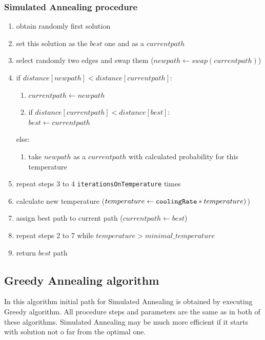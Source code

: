\documentclass[titlepage]{article}
\begin{document}
\subsubsection{Simulated Annealing procedure}

\begin{enumerate}
	\item obtain randomly first solution
	\item set this solution as the $best$ one and as a $currentpath$
	\item select randomly two edges and swap them ($newpath \leftarrow swap(currentpath)$)
	\item if $distance[newpath] < distance[currentpath]$:
	\begin{enumerate}[label*=\arabic*.]
		\item $currentpath \leftarrow newpath$
		\item if $distance[currentpath] < distance[best]$: \\
		\hspace*{5mm} $best \leftarrow currentpath$
	\end{enumerate}
	else:
	\begin{enumerate}[label*=\arabic*.]
		\item take $newpath$ as a $currentpath$ with calculated probability for this temperature
	\end{enumerate}
	\item repeat steps 3 to 4 \texttt{iterationsOnTemperature} times
	\item calculate new temperature ($temperature \leftarrow \mbox{\texttt{coolingRate}}*temperature)$)
	\item assign best path to current path ($currentpath \leftarrow best$)
	\item repeat steps 2 to 7 while $temperature > minimal\_temperature$
	\item return $best$ path
	
\end{enumerate}

\subsection{Greedy Annealing algorithm}

In this algorithm initial path for Simulated Annealing is obtained by executing Greedy algorithm. All procedure steps and parameters are the same as in both of these algorithms. Simulated Annealing may be much more efficient if it starts with solution not o far from the optimal one. 
\end{document}
